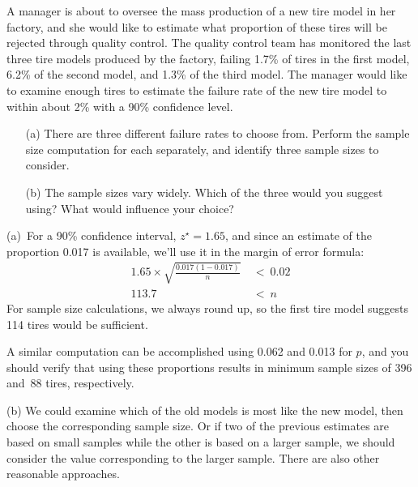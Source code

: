 \begin{example}{A manager is about to oversee the mass production of a new tire model in her factory, and she would like to estimate what proportion of these tires will be rejected through quality control. The quality control team has monitored the last three tire models produced by the factory, failing 1.7\% of tires in the first model, 6.2\% of the second model, and 1.3\% of the third model. The manager would like to examine enough tires to estimate the failure rate of the new tire model to within about 2\% with a 90\% confidence level.
\begin{enumerate}
\setlength{\itemsep}{0mm}
\item[(a)] There are three different failure rates to choose from. Perform the sample size computation for each separately, and identify three sample sizes to consider.
\item[(b)] The sample sizes vary widely. Which of the three would you suggest using? What would influence your choice?
\end{enumerate}}
(a)~For a 90\% confidence interval, $z^{\star} = 1.65$, and since an estimate of the proportion 0.017 is available, we'll use it in the margin of error formula: %
\begin{align*}
1.65\times \sqrt{\frac{0.017(1-0.017)}{n}} &\ < \ 0.02 \\
113.7 &\ < \ n
\end{align*}
For sample size calculations, we always round up, so the first tire model suggests 114 tires would be sufficient.

A similar computation can be accomplished using 0.062 and 0.013 for $p$, and you should verify that using these proportions results in minimum sample sizes of 396 and~88 tires, respectively.

(b) We could examine which of the old models is most like the new model, then choose the corresponding sample size. Or if two of the previous estimates are based on small samples while the other is based on a larger sample, we should consider the value corresponding to the larger sample. There are also other reasonable approaches.
\end{example}


